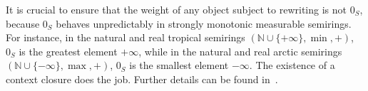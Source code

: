 It is crucial to ensure that the weight of any object subject to rewriting is not $0_S$, because \(0_S\) behaves unpredictably in strongly monotonic measurable semirings. For instance, in the natural and real tropical semirings \((\mathbb{N} \cup \{+\infty\}, \min, +)\), \(0_S\) is the greatest element \(+\infty\), while in the natural and real arctic semirings \((\mathbb{N} \cup \{-\infty\}, \max, +)\), \(0_S\) is the smallest element \(-\infty\).
The existence of a context closure does the job. Further details can be found in~\cite[]{endrullis2024generalized}.


